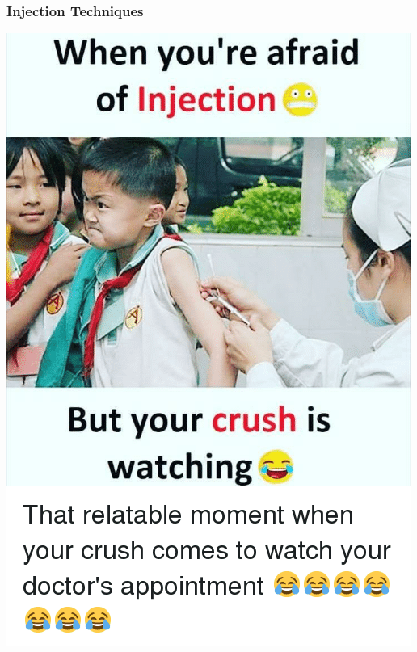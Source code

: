 \documentclass[aspectratio=169]{beamer}
\begin{document}
\begin{frame}
  \frametitle{Injection Techniques}
  \begin{center}
    \includegraphics[scale=.275]{injection-meme}
  \end{center}
\end{frame}
\end{document}
